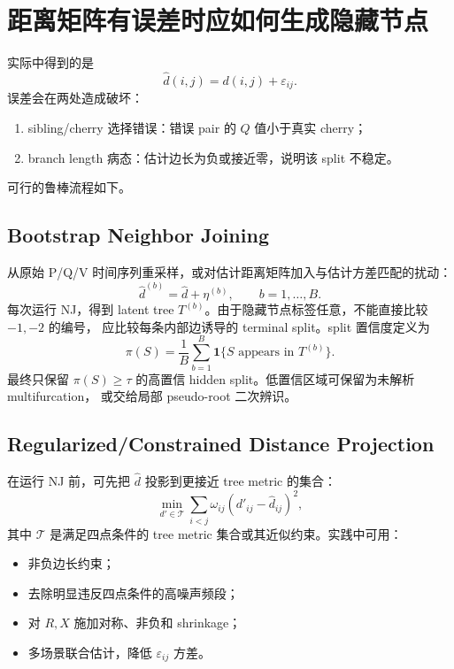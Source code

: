 \documentclass[UTF8,11pt]{ctexart}
\begin{document}
\section{距离矩阵有误差时应如何生成隐藏节点}

实际中得到的是
\begin{equation}
  \hat d(i,j)=d(i,j)+\varepsilon_{ij}.
\end{equation}
误差会在两处造成破坏：
\begin{enumerate}[leftmargin=2em]
  \item sibling/cherry 选择错误：错误 pair 的 $Q$ 值小于真实 cherry；
  \item branch length 病态：估计边长为负或接近零，说明该 split 不稳定。
\end{enumerate}

可行的鲁棒流程如下。

\subsection{Bootstrap Neighbor Joining}

从原始 P/Q/V 时间序列重采样，或对估计距离矩阵加入与估计方差匹配的扰动：
\begin{equation}
  \hat d^{(b)}=\hat d+\eta^{(b)},\qquad b=1,\ldots,B.
\end{equation}
每次运行 NJ，得到 latent tree $T^{(b)}$。由于隐藏节点标签任意，不能直接比较 $-1,-2$ 的编号，
应比较每条内部边诱导的 terminal split。split 置信度定义为
\begin{equation}
  \pi(S)=\frac{1}{B}\sum_{b=1}^B
  \mathbf{1}\{S\text{ appears in }T^{(b)}\}.
\end{equation}
最终只保留 $\pi(S)\ge \tau$ 的高置信 hidden split。低置信区域可保留为未解析 multifurcation，
或交给局部 pseudo-root 二次辨识。

\subsection{Regularized/Constrained Distance Projection}

在运行 NJ 前，可先把 $\hat d$ 投影到更接近 tree metric 的集合：
\begin{equation}
  \min_{d'\in \mathcal{T}} \sum_{i<j}\omega_{ij}(d'_{ij}-\hat d_{ij})^2,
\end{equation}
其中 $\mathcal{T}$ 是满足四点条件的 tree metric 集合或其近似约束。实践中可用：
\begin{itemize}[leftmargin=2em]
  \item 非负边长约束；
  \item 去除明显违反四点条件的高噪声频段；
  \item 对 $R,X$ 施加对称、非负和 shrinkage；
  \item 多场景联合估计，降低 $\varepsilon_{ij}$ 方差。
\end{itemize}
\end{document}
